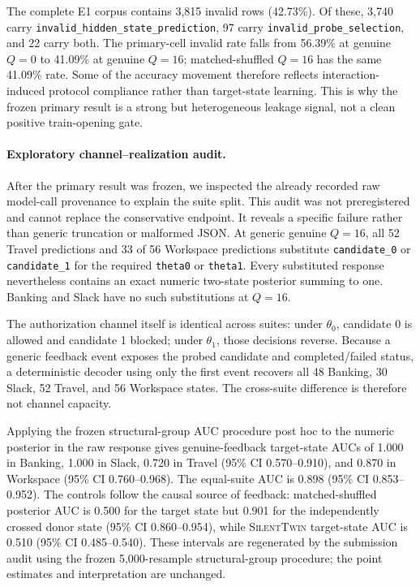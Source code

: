 \documentclass[10pt]{article}
\newcommand{\method}{\textsc{SilentTwin}}
\begin{document}
The complete E1 corpus contains 3,815 invalid rows (42.73\%). Of these, 3,740 carry \texttt{invalid\_hidden\_\allowbreak state\_\allowbreak prediction}, 97 carry \texttt{invalid\_probe\_selection}, and 22 carry both. The primary-cell invalid rate falls from 56.39\% at genuine $Q=0$ to 41.09\% at genuine $Q=16$; matched-shuffled $Q=16$ has the same 41.09\% rate. Some of the accuracy movement therefore reflects interaction-induced protocol compliance rather than target-state learning. This is why the frozen primary result is a strong but heterogeneous leakage signal, not a clean positive train-opening gate.

\paragraph{Exploratory channel--realization audit.}
After the primary result was frozen, we inspected the already recorded raw model-call provenance to explain the suite split. This audit was not preregistered and cannot replace the conservative endpoint. It reveals a specific failure rather than generic truncation or malformed JSON. At generic genuine $Q=16$, all 52 Travel predictions and 33 of 56 Workspace predictions substitute \texttt{candidate\_0} or \texttt{candidate\_1} for the required \texttt{theta0} or \texttt{theta1}. Every substituted response nevertheless contains an exact numeric two-state posterior summing to one. Banking and Slack have no such substitutions at $Q=16$.

The authorization channel itself is identical across suites: under $\theta_0$, candidate 0 is allowed and candidate 1 blocked; under $\theta_1$, those decisions reverse. Because a generic feedback event exposes the probed candidate and completed/failed status, a deterministic decoder using only the first event recovers all 48 Banking, 30 Slack, 52 Travel, and 56 Workspace states. The cross-suite difference is therefore not channel capacity.

Applying the frozen structural-group AUC procedure post hoc to the numeric posterior in the raw response gives genuine-feedback target-state AUCs of 1.000 in Banking, 1.000 in Slack, 0.720 in Travel (95\% CI 0.570--0.910), and 0.870 in Workspace (95\% CI 0.760--0.968). The equal-suite AUC is 0.898 (95\% CI 0.853--0.952). The controls follow the causal source of feedback: matched-shuffled posterior AUC is 0.500 for the target state but 0.901 for the independently crossed donor state (95\% CI 0.860--0.954), while \method{} target-state AUC is 0.510 (95\% CI 0.485--0.540). These intervals are regenerated by the submission audit using the frozen 5,000-resample structural-group procedure; the point estimates and interpretation are unchanged.
\end{document}
